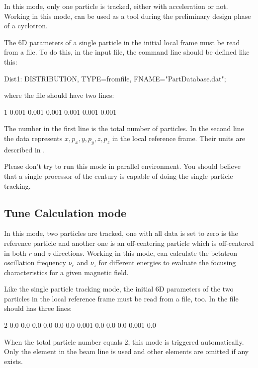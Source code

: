   In this mode, only one particle is tracked, either with acceleration or not.  Working in this mode, \opalcycl
  can be used as a tool during the preliminary design phase of a cyclotron.

  The 6D parameters of a single particle in the initial local frame must be read from a file. To do this, in the \opal input file,
  the command line   should be defined like this:
\begin{example}
  Dist1: DISTRIBUTION, TYPE=fromfile, FNAME="PartDatabase.dat";
\end{example}
 where the file  should have two lines:
\begin{example}
 1
 0.001 0.001   0.001   0.001   0.001  0.001
\end{example}
The number in the first line is the total number of particles.
In the second line the data represents $x, p_x, y,$$ p_y, z, p_z$ in the local reference frame. Their units are described in .

Please don't try to run this mode in parallel environment. You should believe that a single processor of the  century is capable of doing
the single particle tracking.

\subsection{Tune Calculation mode}

  In this mode, two particles are tracked, one with all data is set to zero is the reference particle and another one is an off-centering particle
  which is off-centered in both $r$ and $z$ directions. Working in this mode, \opalcycl can calculate the betatron oscillation frequency $\nu_r$ and $\nu_z$ for different energies to evaluate the focusing characteristics
  for a given magnetic field.

  Like the single particle tracking mode,
  the initial 6D parameters of the two particles in the local reference frame must be read from a file, too.
  In the file should has three lines:
\begin{example}
 2
 0.0   0.0   0.0   0.0   0.0   0.0
 0.001 0.0   0.0   0.0   0.001  0.0
\end{example}

When the total particle number equals 2, this mode is triggered automatically.
Only the element  in the beam line is used and other elements are omitted if any exists.


